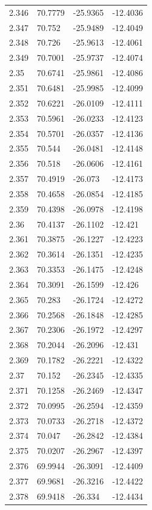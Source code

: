 \begin{tabular}{llll}
2.346 & 70.7779 & -25.9365 & -12.4036 \\
2.347 & 70.752 & -25.9489 & -12.4049 \\
2.348 & 70.726 & -25.9613 & -12.4061 \\
2.349 & 70.7001 & -25.9737 & -12.4074 \\
2.35 & 70.6741 & -25.9861 & -12.4086 \\
2.351 & 70.6481 & -25.9985 & -12.4099 \\
2.352 & 70.6221 & -26.0109 & -12.4111 \\
2.353 & 70.5961 & -26.0233 & -12.4123 \\
2.354 & 70.5701 & -26.0357 & -12.4136 \\
2.355 & 70.544 & -26.0481 & -12.4148 \\
2.356 & 70.518 & -26.0606 & -12.4161 \\
2.357 & 70.4919 & -26.073 & -12.4173 \\
2.358 & 70.4658 & -26.0854 & -12.4185 \\
2.359 & 70.4398 & -26.0978 & -12.4198 \\
2.36 & 70.4137 & -26.1102 & -12.421 \\
2.361 & 70.3875 & -26.1227 & -12.4223 \\
2.362 & 70.3614 & -26.1351 & -12.4235 \\
2.363 & 70.3353 & -26.1475 & -12.4248 \\
2.364 & 70.3091 & -26.1599 & -12.426 \\
2.365 & 70.283 & -26.1724 & -12.4272 \\
2.366 & 70.2568 & -26.1848 & -12.4285 \\
2.367 & 70.2306 & -26.1972 & -12.4297 \\
2.368 & 70.2044 & -26.2096 & -12.431 \\
2.369 & 70.1782 & -26.2221 & -12.4322 \\
2.37 & 70.152 & -26.2345 & -12.4335 \\
2.371 & 70.1258 & -26.2469 & -12.4347 \\
2.372 & 70.0995 & -26.2594 & -12.4359 \\
2.373 & 70.0733 & -26.2718 & -12.4372 \\
2.374 & 70.047 & -26.2842 & -12.4384 \\
2.375 & 70.0207 & -26.2967 & -12.4397 \\
2.376 & 69.9944 & -26.3091 & -12.4409 \\
2.377 & 69.9681 & -26.3216 & -12.4422 \\
2.378 & 69.9418 & -26.334 & -12.4434 \\

\end{tabular}
